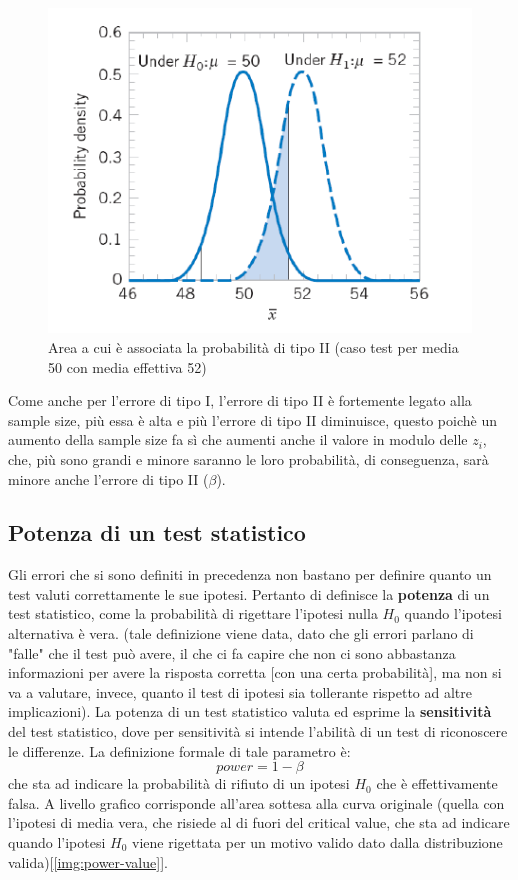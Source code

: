 \begin{figure}[h]
\centering
\includegraphics[width=.6\textwidth]{img/chapter-4/type-II-error.png}
\caption{Area a cui è associata la probabilità di tipo II (caso test per media 50 con media effettiva 52)}\label{img:type-II-error}
\end{figure}

Come anche per l'errore di tipo I, l'errore di tipo II è fortemente legato alla sample size, più essa è alta e più l'errore di tipo II diminuisce, questo poichè un aumento della sample size fa sì che aumenti anche il valore in modulo delle \(z_i\), che, più sono grandi e minore saranno le loro probabilità, di conseguenza, sarà minore anche l'errore di tipo II (\(\beta\)).

\subsection{Potenza di un test statistico}
Gli errori che si sono definiti in precedenza non bastano per definire quanto un test valuti correttamente le sue ipotesi. Pertanto di definisce la \textbf{potenza} di un test statistico, come la probabilità di rigettare l'ipotesi nulla \(H_0\) quando l'ipotesi alternativa è vera. (tale definizione viene data, dato che gli errori parlano di "falle" che il test può avere, il che ci fa capire che non ci sono abbastanza informazioni per avere la risposta corretta [con una certa probabilità], ma non si va a valutare, invece, quanto il test di ipotesi sia tollerante rispetto ad altre implicazioni). La potenza di un test statistico valuta ed esprime la \textbf{sensitività} del test statistico, dove per sensitività si intende l'abilità di un test di riconoscere le differenze. La definizione formale di tale parametro è:
\[
power = 1 - \beta
\]
che sta ad indicare la probabilità di rifiuto di un ipotesi \(H_0\) che è effettivamente falsa. A livello grafico corrisponde all'area sottesa alla curva originale (quella con l'ipotesi di media vera, che risiede al di fuori del critical value, che sta ad indicare quando l'ipotesi \(H_0\) viene rigettata per un motivo valido dato dalla distribuzione valida)[\ref{img:power-value}].

